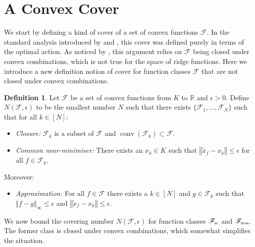 \documentclass[letter, 12pt]{report}
\newcommand{\pr}{\text{\tiny\texttt{r}}}
\newcommand{\pb}{\text{\tiny\texttt{b}}}
\newcommand{\pl}{\text{\tiny\texttt{l}}}
\renewcommand{\pm}{\text{\tiny\texttt{m}}}
\newcommand{\R}{\mathbb R}
\newcommand{\norm}[1]{\left \Vert  #1 \right \Vert}
\newcommand{\sF}{\mathscr F}
\newcommand{\conv}{\operatorname{conv}}
\newcommand{\1}{\mathbf{1}}
\theoremstyle{plain}
\theoremstyle{definition}
\newtheorem{definition}[theorem]{Definition}
\theoremstyle{remark}
\begin{document}
\section{A Convex Cover}\label{sec:cover}
We start by defining a kind of cover of a set of convex functions $\sF$.
In the standard analysis introduced by \cite{BDKP15} and \cite{BE18}, this cover was defined purely in terms of the optimal action.
As noticed by \cite{lattimore2021minimax}, this argument relies on $\sF$ being closed under convex combinations, which is not true
for the space of ridge functions. Here we introduce a new definition notion of cover for function classes $\sF$ that are not closed
under convex combinations.
\begin{definition}\label{def:cover}
    Let $\sF$ be a set of convex functions from $K$ to $\R$ and $\epsilon > 0$.
    Define $N(\sF, \epsilon)$ to be the smallest number $N$ such that there exists $\{\sF_1,\ldots,\sF_N\}$ such that for all $k \in [N]$:
    \begin{itemize}
        \item \textit{Closure:} $\sF_k$ is a subset of $\sF$ and $\conv(\sF_k) \subset \sF$.
        \item \textit{Common near-minimiser:} There exists an $x_k \in K$ such that $\norm{\tilde x_f - x_k} \leq \epsilon$ for all $f \in \sF_k$.
    \end{itemize}
    Moreover:
    \begin{itemize}
        \item \textit{Approximation:} For all $f \in \sF$ there exists a $k \in [N]$ and $g \in \sF_k$ such that $\norm{f - g}_\infty \leq \epsilon$
              and $\norm{\tilde x_f - x_k} \leq \epsilon$.
    \end{itemize}
\end{definition}
We now bound the covering number $N(\sF, \epsilon)$ for function classes $\sF_{\pb\pl}$ and $\sF_{\pb\pl\pr\pm}$.
The former class is closed under convex combinations, which somewhat simplifies the situation.
\end{document}
